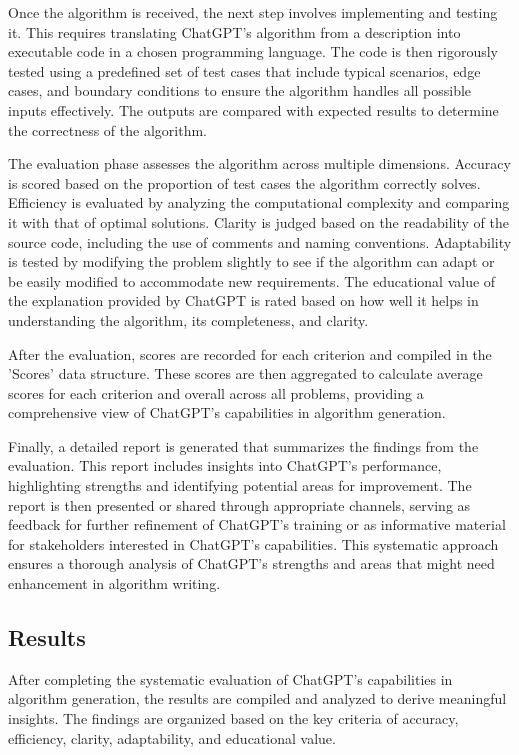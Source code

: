 \documentclass{article}
\begin{document}
Once the algorithm is received, the next step involves implementing and testing it. This requires translating ChatGPT's algorithm from a description into executable code in a chosen programming language. The code is then rigorously tested using a predefined set of test cases that include typical scenarios, edge cases, and boundary conditions to ensure the algorithm handles all possible inputs effectively. The outputs are compared with expected results to determine the correctness of the algorithm.

The evaluation phase assesses the algorithm across multiple dimensions. Accuracy is scored based on the proportion of test cases the algorithm correctly solves. Efficiency is evaluated by analyzing the computational complexity and comparing it with that of optimal solutions. Clarity is judged based on the readability of the source code, including the use of comments and naming conventions. Adaptability is tested by modifying the problem slightly to see if the algorithm can adapt or be easily modified to accommodate new requirements. The educational value of the explanation provided by ChatGPT is rated based on how well it helps in understanding the algorithm, its completeness, and clarity.

After the evaluation, scores are recorded for each criterion and compiled in the 'Scores' data structure. These scores are then aggregated to calculate average scores for each criterion and overall across all problems, providing a comprehensive view of ChatGPT's capabilities in algorithm generation.

Finally, a detailed report is generated that summarizes the findings from the evaluation. This report includes insights into ChatGPT's performance, highlighting strengths and identifying potential areas for improvement. The report is then presented or shared through appropriate channels, serving as feedback for further refinement of ChatGPT's training or as informative material for stakeholders interested in ChatGPT's capabilities. This systematic approach ensures a thorough analysis of ChatGPT's strengths and areas that might need enhancement in algorithm writing. 

\subsection{Results}

After completing the systematic evaluation of ChatGPT's capabilities in algorithm generation, the results are compiled and analyzed to derive meaningful insights. The findings are organized based on the key criteria of accuracy, efficiency, clarity, adaptability, and educational value.
\end{document}
